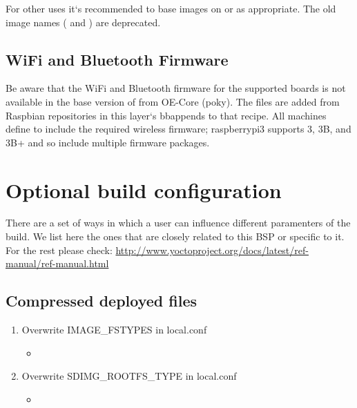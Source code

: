 \documentclass[letterpaper,10pt,english]{sphinxmanual}
\begin{document}
For other uses it`s recommended to base images on  or
 as appropriate. The old image names ( and
) are deprecated.


\section{WiFi and Bluetooth Firmware}
\label{layer-contents:wifi-and-bluetooth-firmware}
Be aware that the WiFi and Bluetooth firmware for the supported boards
is not available in the base version of  from OE-Core
(poky). The files are added from Raspbian repositories in this layer`s
bbappends to that recipe. All machines define
 to include the required wireless firmware;
raspberrypi3 supports 3, 3B, and 3B+ and so include multiple firmware
packages.


\chapter{Optional build configuration}
\label{extra-build-config::doc}\label{extra-build-config:optional-build-configuration}
There are a set of ways in which a user can influence different paramenters of
the build. We list here the ones that are closely related to this BSP or
specific to it. For the rest please check:
\href{http://www.yoctoproject.org/docs/latest/ref-manual/ref-manual.html}{http://www.yoctoproject.org/docs/latest/ref-manual/ref-manual.html}


\section{Compressed deployed files}
\label{extra-build-config:compressed-deployed-files}\begin{enumerate}
\item {} 
Overwrite IMAGE\_FSTYPES in local.conf
\begin{itemize}
\item {} 

\end{itemize}

\item {} 
Overwrite SDIMG\_ROOTFS\_TYPE in local.conf
\begin{itemize}
\item {} 

\end{itemize}

\end{enumerate}
\end{document}
